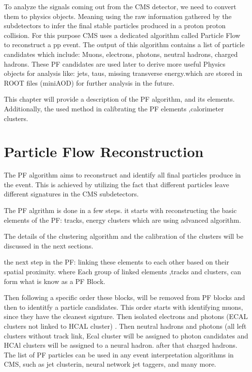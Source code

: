 
To analyze the signals coming out from the CMS detector, we need to convert them to physics objects.
Meaning using the raw information gathered by the subdetectors to infer the final stable particles produced in a proton proton collision.
For this purpose CMS uses a dedicated algorithm called Particle Flow to reconstruct a pp event.
The output of this algorithm contains a list of particle candidates which include: Muons, electrons, photons, neutral hadrons, charged hadrons.
These PF candidates are used later to derive more useful Physics objects for analysis like:
jets, taus,  missing transverse energy.which are stored in ROOT files (miniAOD) for further analysis in the future.

This chapter will provide a description of the PF algorithm, and its elements. Additionally, the used method in calibrating the PF elements ,calorimeter clusters.   


\section{Particle Flow Reconstruction}

The PF algorithm aims to reconstruct and identify all final particles produce in the event.
This is achieved  by utilizing the fact that different particles leave different signatures in the CMS subdetectors.

The PF algrithm is done in a few steps.
it starts with reconstructing the basic elements of the PF: tracks, energy clusters which are using advanced algorithm.

The details of the clustering algorithm and the calibration of the clusters will be discussed in the next sections.

the next step in the PF: linking these elements to each other based on their spatial proximity.
where Each group of linked elements ,tracks and clusters, can form what is know as a PF Block.

Then following a specific order these blocks, will be removed from PF blocks and then to identitfy a particle candidates.
This order starts with identifying muons, since they have the cleanest signture.
Then isolated electrons and photons (ECAL clusters not linked to HCAL cluster) .
Then neutral hadrons and photons (all left clusters without track link, Ecal cluster will be assigned to photon candidates and HCAl clusters will be assigned to a neural hadron.
after that charged hadrons. 
The list of PF particles  can be used in any event interpretation algorithms in CMS, such as jet clusterin, neural network jet taggers, and  many more.


